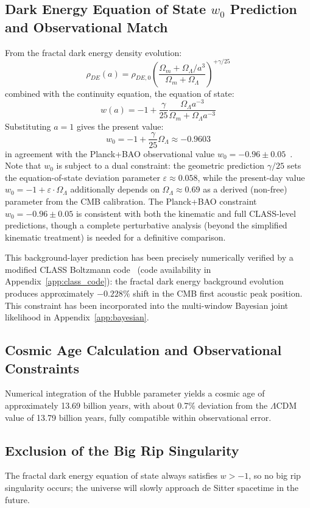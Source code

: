 \documentclass[12pt,a4paper,twocolumn]{article}
\begin{document}
\subsection{Dark Energy Equation of State $w_0$ Prediction and Observational Match}
From the fractal dark energy density evolution:
\[
\rho_{DE}(a) = \rho_{DE,0} \left( \frac{\Omega_m + \Omega_\Lambda/a^3}{\Omega_m + \Omega_\Lambda} \right)^{+\gamma/25}
\]
combined with the continuity equation, the equation of state:
\[
w(a) = -1 + \frac{\gamma}{25} \frac{\Omega_\Lambda a^{-3}}{\Omega_m + \Omega_\Lambda a^{-3}}
\]
Substituting $a=1$ gives the present value:
\[
w_0 = -1 + \frac{\gamma}{25} \Omega_\Lambda \approx -0.9603
\]
in agreement with the Planck+BAO observational value $w_0 = -0.96 \pm 0.05$~\cite{Planck2020}. Note that $w_0$ is subject to a dual constraint: the geometric prediction $\gamma/25$ sets the equation-of-state deviation parameter $\varepsilon \approx 0.058$, while the present-day value $w_0 = -1 + \varepsilon \cdot \Omega_\Lambda$ additionally depends on $\Omega_\Lambda \approx 0.69$ as a derived (non-free) parameter from the CMB calibration. The Planck+BAO constraint $w_0 = -0.96 \pm 0.05$ is consistent with both the kinematic and full CLASS-level predictions, though a complete perturbative analysis (beyond the simplified kinematic treatment) is needed for a definitive comparison.

This background-layer prediction has been precisely numerically verified by a modified CLASS Boltzmann code~\cite{class_code} (code availability in Appendix~\ref{app:class_code}): the fractal dark energy background evolution produces approximately $\mathbf{-0.228\%}$ shift in the CMB first acoustic peak position. This constraint has been incorporated into the multi-window Bayesian joint likelihood in Appendix~\ref{app:bayesian}.

\subsection{Cosmic Age Calculation and Observational Constraints}
Numerical integration of the Hubble parameter yields a cosmic age of approximately 13.69 billion years, with about 0.7\% deviation from the $\Lambda$CDM value of 13.79 billion years, fully compatible within observational error.

\subsection{Exclusion of the Big Rip Singularity}
The fractal dark energy equation of state always satisfies $w > -1$, so no big rip singularity occurs; the universe will slowly approach de Sitter spacetime in the future.
\end{document}
